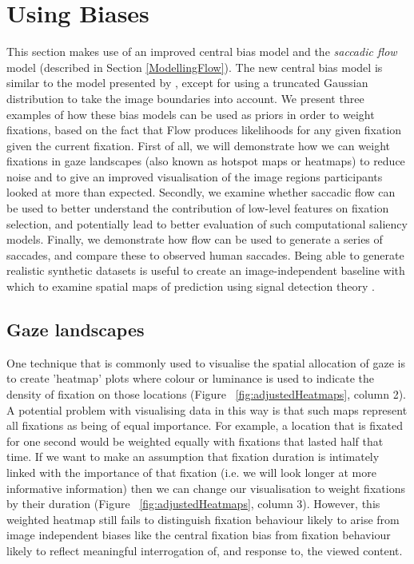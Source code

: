 

\section{Using Biases}
\label{sec:usingbiases}

This section makes use of an improved central bias model and the \textit{saccadic flow} model (described in Section \ref{ModellingFlow}). The new central bias model is similar to the model presented by \cite{clarke-tatler2014}, except for using a truncated Gaussian distribution to take the image boundaries into account. We present three examples of how these bias models can be used as priors in order to weight fixations, based on the fact that Flow produces likelihoods for any given fixation given the current fixation. First of all, we will demonstrate how we can weight fixations in gaze landscapes (also known as hotspot maps or heatmaps) to reduce noise and to give an improved visualisation of the image regions participants looked at more than expected. Secondly, we examine whether saccadic flow can be used to better understand the contribution of low-level features on fixation selection, and potentially lead to better evaluation of such computational saliency models. Finally, we demonstrate how flow can be used to generate a series of saccades, and compare these to observed human saccades. Being able to generate realistic synthetic datasets is useful to create an image-independent baseline with which to examine spatial maps of prediction using signal detection theory \citep[see][]{clarke-tatler2014}.

\subsection{Gaze landscapes}

One technique that is commonly used to visualise the spatial allocation of gaze is to create 'heatmap' plots where colour or luminance is used to indicate the density of fixation on those locations (Figure ~\ref{fig:adjustedHeatmaps}, column 2). A potential problem with visualising data in this way is that such maps represent all fixations as being of equal importance. For example, a location that is fixated for one second would be weighted equally with fixations that lasted half that time. If we want to make an assumption that fixation duration is intimately linked with the importance of that fixation (i.e. we will look longer at more informative information) then we can change our visualisation to weight fixations by their duration (Figure ~\ref{fig:adjustedHeatmaps}, column 3). However, this weighted heatmap still fails to distinguish fixation behaviour likely to arise from image independent biases like the central fixation bias from fixation behaviour likely to reflect meaningful interrogation of, and response to, the viewed content.


